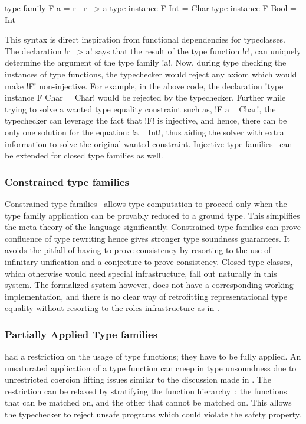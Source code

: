 \documentclass[screen,nonacm,manuscript,review]{acmart} %
\begin{document}
\begin{CenteredBox}
\begin{code}
type family F a = r | r ~> a
type instance F Int = Char
type instance F Bool = Int
\end{code}
\end{CenteredBox}
This syntax is direct inspiration from functional dependencies for typeclasses. The declaration !r ~> a! says that the result of the type function !r!, can uniquely determine the argument of the type family !a!. Now, during type checking the instances of type functions, the typechecker would reject any axiom which would make !F! non-injective. For example, in the above code, the declaration !type instance F Char = Char! would be rejected by the typechecker. Further while trying to solve a wanted type equality constraint such as, !F a ~ Char!, the typechecker can leverage the fact that !F! is injective, and hence, there can be only one solution for the equation: !a ~ Int!, thus aiding the solver with extra information to solve the original wanted constraint. Injective type families~\cite{stolarek_injective_2015} can be extended for closed type families as well.

\subsubsection{Constrained type families}
Constrained type families~\cite{morris_typefamilies_2017} allows type computation to proceed only when the type family application can be provably reduced to a ground type. This simplifies the meta-theory of the language significantly. Constrained type families can prove confluence of type rewriting hence gives stronger type soundness guarantees. It avoids the pitfall of having to prove consistency by resorting to the use of infinitary unification and a conjecture to prove consistency. Closed type classes, which otherwise would need special infrastructure, fall out naturally in this system. The formalized system however, does not have a corresponding  working implementation, and there is no clear way of retrofitting representational type equality without resorting to the roles infrastructure as in \SFR.

\subsubsection{Partially Applied Type families}
\SFC had a restriction on the usage of type functions; they have to
be fully applied. An unsaturated application of a type function can
creep in type unsoundness due to unrestricted coercion lifting issues
similar to the discussion made in \SFP. The restriction can be
relaxed by stratifying the function
hierarchy~\cite{kiss_higher-order_2019}: the functions that can be
matched on, and the other that cannot be matched on. This allows the
typechecker to reject unsafe programs which could violate the
safety property.
\end{document}
